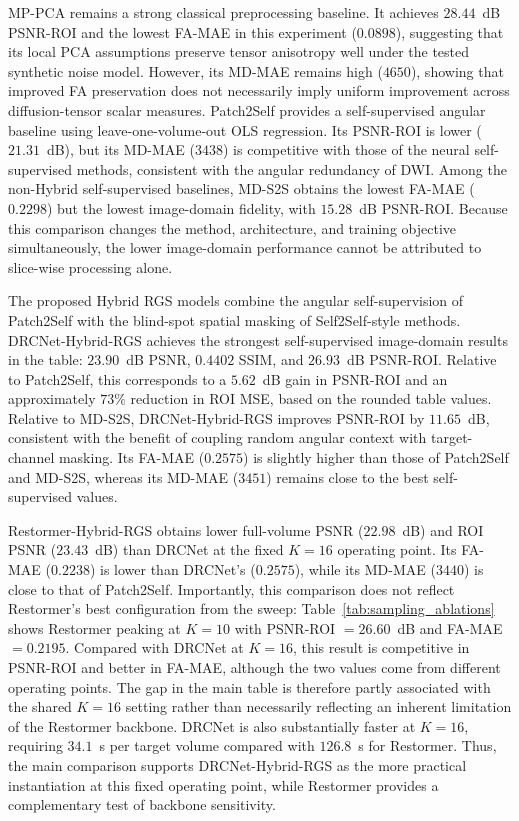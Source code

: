\documentclass[preprint,12pt]{elsarticle}
\begin{document}
MP-PCA remains a strong classical preprocessing baseline. It achieves $28.44$~dB PSNR-ROI and the lowest FA-MAE in this experiment ($0.0898$), suggesting that its local PCA assumptions preserve tensor anisotropy well under the tested synthetic noise model. However, its MD-MAE remains high ($4650$), showing that improved FA preservation does not necessarily imply uniform improvement across diffusion-tensor scalar measures. Patch2Self provides a self-supervised angular baseline using leave-one-volume-out OLS regression. Its PSNR-ROI is lower ($21.31$~dB), but its MD-MAE ($3438$) is competitive with those of the neural self-supervised methods, consistent with the angular redundancy of DWI. Among the non-Hybrid self-supervised baselines, MD-S2S obtains the lowest FA-MAE ($0.2298$) but the lowest image-domain fidelity, with $15.28$~dB PSNR-ROI. Because this comparison changes the method, architecture, and training objective simultaneously, the lower image-domain performance cannot be attributed to slice-wise processing alone.

The proposed Hybrid RGS models combine the angular self-supervision of Patch2Self with the blind-spot spatial masking of Self2Self-style methods. DRCNet-Hybrid-RGS achieves the strongest self-supervised image-domain results in the table: $23.90$~dB PSNR, $0.4402$ SSIM, and $26.93$~dB PSNR-ROI. Relative to Patch2Self, this corresponds to a $5.62$~dB gain in PSNR-ROI and an approximately $73\%$ reduction in ROI MSE, based on the rounded table values. Relative to MD-S2S, DRCNet-Hybrid-RGS improves PSNR-ROI by $11.65$~dB, consistent with the benefit of coupling random angular context with target-channel masking. Its FA-MAE ($0.2575$) is slightly higher than those of Patch2Self and MD-S2S, whereas its MD-MAE ($3451$) remains close to the best self-supervised values.

Restormer-Hybrid-RGS obtains lower full-volume PSNR ($22.98$~dB) and ROI PSNR ($23.43$~dB) than DRCNet at the fixed $K=16$ operating point. Its FA-MAE ($0.2238$) is lower than DRCNet's ($0.2575$), while its MD-MAE ($3440$) is close to that of Patch2Self. Importantly, this comparison does not reflect Restormer's best configuration from the sweep: Table~\ref{tab:sampling_ablations} shows Restormer peaking at $K=10$ with PSNR-ROI $=26.60$~dB and FA-MAE $=0.2195$. Compared with DRCNet at $K=16$, this result is competitive in PSNR-ROI and better in FA-MAE, although the two values come from different operating points. The gap in the main table is therefore partly associated with the shared $K=16$ setting rather than necessarily reflecting an inherent limitation of the Restormer backbone. DRCNet is also substantially faster at $K=16$, requiring $34.1$~s per target volume compared with $126.8$~s for Restormer. Thus, the main comparison supports DRCNet-Hybrid-RGS as the more practical instantiation at this fixed operating point, while Restormer provides a complementary test of backbone sensitivity.
\end{document}
